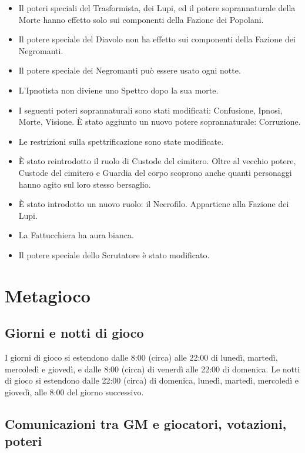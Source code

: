 \documentclass[a4paper,10pt]{article}
\begin{document}
\begin{itemize}
	\item Il poteri speciali del Trasformista, dei Lupi, ed il potere soprannaturale della Morte hanno effetto solo sui componenti della Fazione dei Popolani.
 	\item Il potere speciale del Diavolo non ha effetto sui componenti della Fazione dei Negromanti.
 	\item Il potere speciale dei Negromanti può essere usato ogni notte.
 	\item L'Ipnotista non diviene uno Spettro dopo la sua morte.
 	\item I seguenti poteri soprannaturali sono stati modificati: Confusione, Ipnosi, Morte, Visione. È stato aggiunto un nuovo potere soprannaturale: Corruzione.
 	\item Le restrizioni sulla spettrificazione sono state modificate.
 	\item È stato reintrodotto il ruolo di Custode del cimitero. Oltre al vecchio potere, Custode del cimitero e Guardia del corpo scoprono anche quanti personaggi hanno agito sul loro stesso bersaglio.
 	\item È stato introdotto un nuovo ruolo: il Necrofilo. Appartiene alla Fazione dei Lupi.
 	\item La Fattucchiera ha aura bianca.
 	\item Il potere speciale dello Scrutatore è stato modificato.
\end{itemize}

\pagebreak

\section{Metagioco}

\subsection{Giorni e notti di gioco}

I giorni di gioco si estendono dalle 8:00 (circa) alle 22:00 di lunedì, martedì, mercoledì e giovedì, e dalle 8:00 (circa) di venerdì alle 22:00 di domenica. Le notti di gioco si estendono dalle 22:00 (circa) di domenica, lunedì, martedì, mercoledì e giovedì, alle 8:00 del giorno successivo.

\subsection{Comunicazioni tra GM e giocatori, votazioni, poteri}
\end{document}

